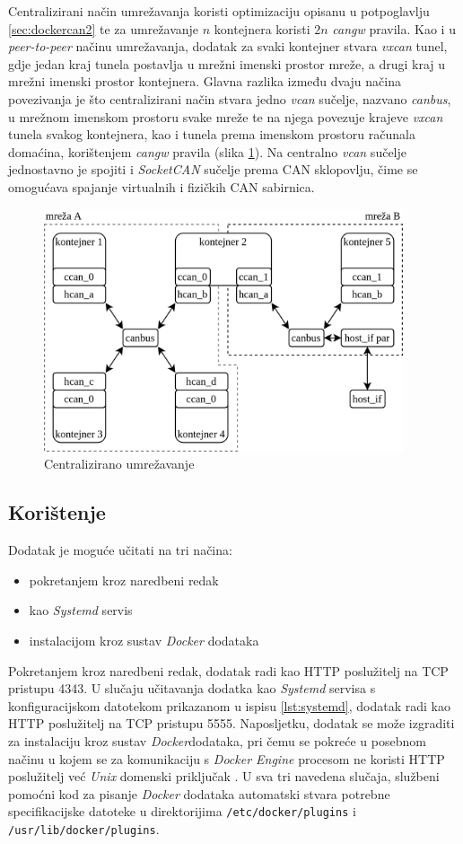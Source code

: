 \documentclass[times, utf8, diplomski, numeric]{fer}
\begin{document}
Centralizirani način umrežavanja koristi optimizaciju opisanu u potpoglavlju \ref{sec:dockercan2} te za umrežavanje $n$ kontejnera koristi $2n$ \textit{cangw} pravila. Kao i u \textit{peer-to-peer} načinu umrežavanja, dodatak za svaki kontejner stvara \textit{vxcan} tunel, gdje jedan kraj tunela postavlja u mrežni imenski prostor mreže, a drugi kraj u mrežni imenski prostor kontejnera. Glavna razlika između dvaju načina povezivanja je što centralizirani način stvara jedno \textit{vcan} sučelje, nazvano \textit{canbus}, u mrežnom imenskom prostoru svake mreže te na njega povezuje krajeve \textit{vxcan} tunela svakog kontejnera, kao i tunela prema imenskom prostoru računala domaćina, korištenjem \textit{cangw} pravila (slika \ref{fig:centralised}). Na centralno \textit{vcan} sučelje jednostavno je spojiti i \textit{SocketCAN} sučelje prema CAN sklopovlju, čime se omogućava spajanje virtualnih i fizičkih CAN sabirnica. 
\newpage
\begin{figure}[htb]
\centering
\includegraphics[width=300pt]{centralizirano_dc.png}
\caption{Centralizirano umrežavanje}
\label{fig:centralised}
\end{figure}
\subsection{Korištenje}
Dodatak je moguće učitati na tri načina:
\begin{itemize}
    \item pokretanjem kroz naredbeni redak
    \item kao \textit{Systemd} servis
    \item instalacijom kroz sustav \textit{Docker} dodataka
\end{itemize}

Pokretanjem kroz naredbeni redak, dodatak radi kao HTTP poslužitelj na TCP pristupu 4343. U slučaju učitavanja dodatka kao \textit{Systemd} servisa s konfiguracijskom datotekom prikazanom u ispisu \ref{lst:systemd}, dodatak radi kao HTTP poslužitelj na TCP pristupu 5555. Naposljetku, dodatak se može izgraditi za instalaciju kroz sustav \textit{Docker}dodataka, pri čemu se pokreće u posebnom načinu u kojem se za komunikaciju s \textit{Docker Engine} procesom ne koristi HTTP poslužitelj već \textit{Unix} domenski priključak . U sva tri navedena slučaja, službeni pomoćni kod za pisanje \textit{Docker} dodataka automatski stvara potrebne specifikacijske datoteke u direktorijima \texttt{/etc/docker/plugins} i \texttt{/usr/lib/docker/plugins}.
\end{document}
